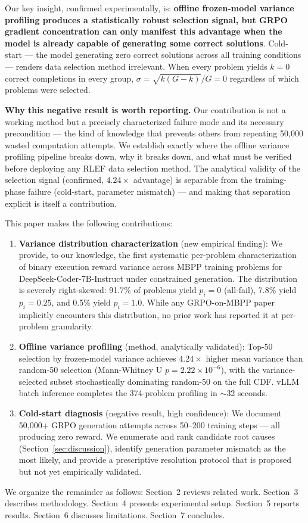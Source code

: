 Our key insight, confirmed experimentally, is: \textbf{offline frozen-model variance profiling produces a statistically robust selection signal, but GRPO gradient concentration can only manifest this advantage when the model is already capable of generating some correct solutions}. Cold-start --- the model generating zero correct solutions across all training conditions --- renders data selection method irrelevant. When every problem yields $k=0$ correct completions in every group, $\sigma=\sqrt{k(G-k)}/G=0$ regardless of which problems were selected.

\textbf{Why this negative result is worth reporting.} Our contribution is not a working method but a precisely characterized failure mode and its necessary precondition --- the kind of knowledge that prevents others from repeating 50,000 wasted computation attempts. We establish exactly where the offline variance profiling pipeline breaks down, why it breaks down, and what must be verified before deploying any RLEF data selection method. The analytical validity of the selection signal (confirmed, $4.24\times$ advantage) is separable from the training-phase failure (cold-start, parameter mismatch) --- and making that separation explicit is itself a contribution.

This paper makes the following contributions:

\begin{enumerate}
\item \textbf{Variance distribution characterization} (new empirical finding): We provide, to our knowledge, the first systematic per-problem characterization of binary execution reward variance across MBPP training problems for DeepSeek-Coder-7B-Instruct under constrained generation. The distribution is severely right-skewed: 91.7\% of problems yield $p_i=0$ (all-fail), 7.8\% yield $p_i=0.25$, and 0.5\% yield $p_i=1.0$. While any GRPO-on-MBPP paper implicitly encounters this distribution, no prior work has reported it at per-problem granularity.

\item \textbf{Offline variance profiling} (method, analytically validated): Top-50 selection by frozen-model variance achieves $4.24\times$ higher mean variance than random-50 selection (Mann-Whitney U $p=2.22\times10^{-6}$), with the variance-selected subset stochastically dominating random-50 on the full CDF. vLLM batch inference completes the 374-problem profiling in $\sim$32 seconds.

\item \textbf{Cold-start diagnosis} (negative result, high confidence): We document 50,000+ GRPO generation attempts across 50--200 training steps --- all producing zero reward. We enumerate and rank candidate root causes (Section~\ref{sec:discussion}), identify generation parameter mismatch as the most likely, and provide a prescriptive resolution protocol that is proposed but not yet empirically validated.
\end{enumerate}

We organize the remainder as follows: Section~2 reviews related work. Section~3 describes methodology. Section~4 presents experimental setup. Section~5 reports results. Section~6 discusses limitations. Section~7 concludes.
